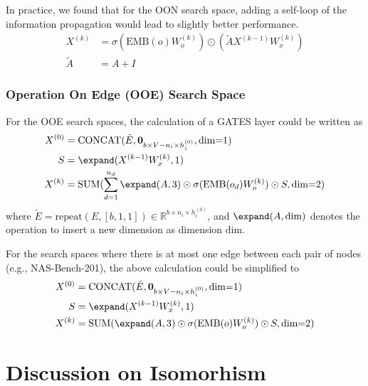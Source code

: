 In practice, we found that for the OON search space, adding a self-loop of the information propagation would lead to slightly better performance. 
\begin{equation}
    \begin{aligned}
        X^{(k)} &= \sigma(\mbox{EMB}(o) W^{(k)}_o) \odot (\tilde{A} X^{(k-1)} W^{(k)}_x) \\
        \tilde{A} &= A + I
    \end{aligned}
\end{equation}


\subsubsection{Operation On Edge (OOE) Search Space}

For the OOE search spaces, the calculation of a GATES layer could be written as
\begin{equation}
\begin{aligned}
X^{(0)} &= \mbox{CONCAT}(\tilde{E}, {\bf 0}_{b \times V-n_i \times h_i^{(0)}}, \mbox{dim=1})\\
S &= \expand(X^{(k-1)} W^{(k)}_x, 1)\\
X^{(k)} &= \mbox{SUM}(\sum_{d=1}^{n_d} \expand(A, 3) \odot \sigma(\mbox{EMB}(o_d) W^{(k)}_o) \odot S, \mbox{dim=2})
\end{aligned}
\label{eq:gates_enas}
\end{equation}
where $\tilde{E} = \mbox{repeat}(E, [b, 1, 1]) \in \mathbb{R}^{b \times n_i \times h^{(0)}_i}$, and $\expand(A, \mbox{dim})$ denotes the operation to insert a new dimension as dimension \textit{$\mbox{dim}$}.

For the search spaces where there is at most one edge between each pair of nodes (e.g., NAS-Bench-201), the above calculation could be simplified to
\begin{equation}
\begin{aligned}
X^{(0)} &= \mbox{CONCAT}(\tilde{E}, {\bf 0}_{b \times V-n_i \times h_i^{(0)}}, \mbox{dim=1})\\
S &= \expand(X^{(k-1)} W^{(k)}_x, 1)\\
X^{(k)} &= \mbox{SUM}(\expand(A, 3) \odot \sigma(\mbox{EMB}(o) W^{(k)}_o) \odot S, \mbox{dim=2})
\end{aligned}
\label{eq:gates_enas}
\end{equation}



\section{Discussion on Isomorhism}

